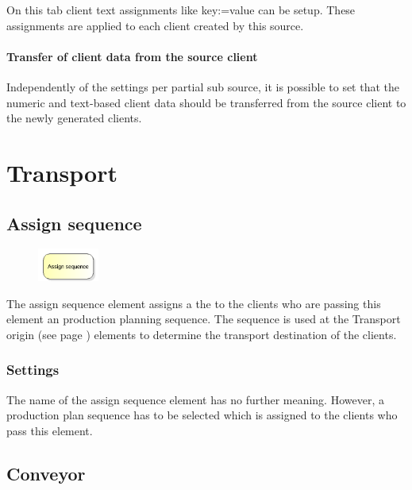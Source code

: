 On this tab client text assignments like key:=value can be setup.
These assignments are applied to each client created by this source.

\subsubsection*{Transfer of client data from the source client}

Independently of the settings per partial sub source, it is possible to set that
the numeric and text-based client data should be transferred from the source client
to the newly generated clients.





\chapter{Transport}

\section{Assign sequence}
\label{ref:ModelElementAssignSequence}

\begin{figure}
\vspace{-22pt}
\includegraphics[width=2cm]{imageModelElementAssignSequence.png}
\vspace{-22pt}
\end{figure}

The assign sequence element assigns a the to the clients who are passing this element an production planning
sequence. The sequence is used at the Transport origin (see page \pageref{ref:ModelElementTransportSource}) 
elements to determine the transport destination of the clients.

\subsection*{Settings}

The name of the assign sequence element has no further meaning. However, a production plan sequence
has to be selected which is assigned to the clients who pass this element.


\section{Conveyor}
\label{ref:ModelElementConveyor}

